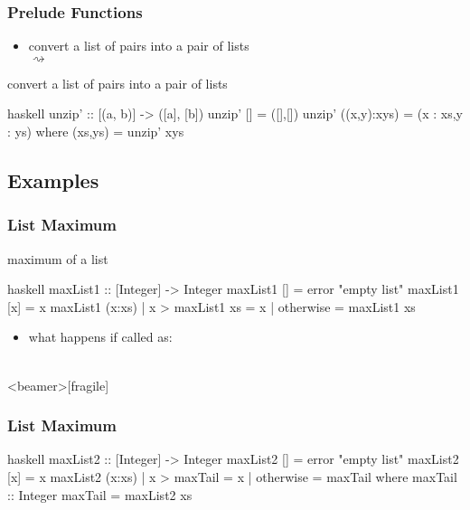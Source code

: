 \documentclass[dvipsnames]{beamer}
\theoremstyle{plain}
\begin{document}
\begin{frame}[fragile]
  \frametitle{Prelude Functions}

  \begin{itemize}
    \item convert a list of pairs into a pair of lists\\
       $\rightsquigarrow$
  \end{itemize}

  \begin{exampleblock}{convert a list of pairs into a pair of lists}
    \begin{pygments}{haskell}
unzip' :: [(a, b)] -> ([a], [b])
unzip' [] = ([],[])
unzip' ((x,y):xys) = (x : xs,y : ys)
  where
    (xs,ys) = unzip' xys
    \end{pygments}
  \end{exampleblock}
\end{frame}

\subsection{Examples}

\begin{frame}[fragile]
  \frametitle{List Maximum}

  \begin{exampleblock}{maximum of a list}
    \begin{pygments}{haskell}
maxList1 :: [Integer] -> Integer
maxList1 [] = error "empty list"
maxList1 [x] = x
maxList1 (x:xs)
  | x > maxList1 xs = x
  | otherwise       = maxList1 xs
    \end{pygments}
  \end{exampleblock}

  \pause
  \begin{itemize}
    \item what happens if called as:\\
      \\
  \end{itemize}
\end{frame}

\begin{frame}<beamer>[fragile]
  \frametitle{List Maximum}

  \begin{exampleblock}{}
    \begin{pygments}{haskell}
maxList2 :: [Integer] -> Integer
maxList2 [] = error "empty list"
maxList2 [x] = x
maxList2 (x:xs)
  | x > maxTail = x
  | otherwise   = maxTail
  where
    maxTail :: Integer
    maxTail = maxList2 xs
    \end{pygments}
  \end{exampleblock}
\end{frame}
\end{document}
